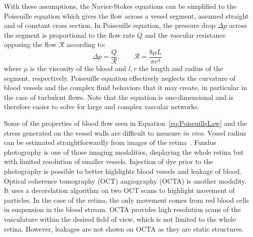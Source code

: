 \documentclass[12pt,a4paper]{journal}
\begin{document}
With these assumptions, the Navier-Stokes equations can be simplified to the Poiseuille equation which gives the flow across a vessel segment, assumed straight and of constant cross section.
In Poiseuille equation, the pressure drop $\Delta p$ across the segment is proportional to the flow rate $Q$ and the vascular resistance opposing the flow $\mathcal{R}$ according to:
\begin{equation}
  \label{eq:PoiseuilleLaw}
  \Delta p = \frac{Q}{\mathcal{R}}, \qquad \mathcal{R} = \frac{8\mu L}{\pi r^4} 
\end{equation}
where $\mu$ is the viscosity of the blood and $l, r$ the length and radius of the segment, respectively.
Poiseuille equation effectively neglects the curvature of blood vessels and the complex fluid behaviors that it may create, in particular in the case of turbulent flows.
Note that the equation is one-dimensional and is therefore easier to solve for large and complex vascular networks.

Some of the properties of blood flow seen in Equation~\ref{eq:PoiseuilleLaw} and the stress generated on the vessel walls are difficult to measure \textit{in vivo}.
Vessel radius can be estimated straightforwardly from images of the retina~\cite{DoblhoffDier2014}.
Fundus photography is one of those imaging modalities, displaying the whole retina but with limited resolution of smaller vessels.
Injection of dye prior to the photography is possible to better highlights blood vessels and leakage of blood.
Optical coherence tomography (OCT) angiography (OCTA) is another modality.
It uses a decorelation algorithm on two OCT scans to highlight movement of particles.
In the case of the retina, the only movement comes from red blood cells in suspension in the blood stream.
OCTA provides high resolution scans of the vasculature within the desired field of view, which is not limited to the whole retina.
However, leakages are not shown on OCTA as they are static structures.
\end{document}
